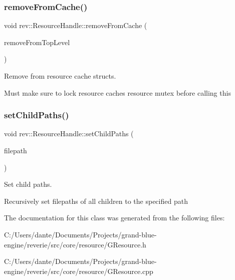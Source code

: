 \mbox{\label{classrev_1_1_resource_handle_a0db096154004c4932e4844fe769f3d0d}} 
\subsubsection{\texorpdfstring{removeFromCache()}{removeFromCache()}}
{\footnotesize\ttfamily void rev\+::\+Resource\+Handle\+::remove\+From\+Cache (\begin{DoxyParamCaption}\item[{bool}]{remove\+From\+Top\+Level }\end{DoxyParamCaption})}



Remove from resource cache structs. 

Must make sure to lock resource cache\textquotesingle{}s resource mutex before calling this \mbox{\label{classrev_1_1_resource_handle_a858af28a2065a86b394e7ddc11349fac}} 
\subsubsection{\texorpdfstring{setChildPaths()}{setChildPaths()}}
{\footnotesize\ttfamily void rev\+::\+Resource\+Handle\+::set\+Child\+Paths (\begin{DoxyParamCaption}\item[{const \mbox{\hyperlink{classrev_1_1_g_string}{G\+String}} \&}]{filepath }\end{DoxyParamCaption})}



Set child paths. 

Recursively set filepaths of all children to the specified path 

The documentation for this class was generated from the following files\+:\begin{DoxyCompactItemize}
\item 
C\+:/\+Users/dante/\+Documents/\+Projects/grand-\/blue-\/engine/reverie/src/core/resource/G\+Resource.\+h\item 
C\+:/\+Users/dante/\+Documents/\+Projects/grand-\/blue-\/engine/reverie/src/core/resource/G\+Resource.\+cpp\end{DoxyCompactItemize}
